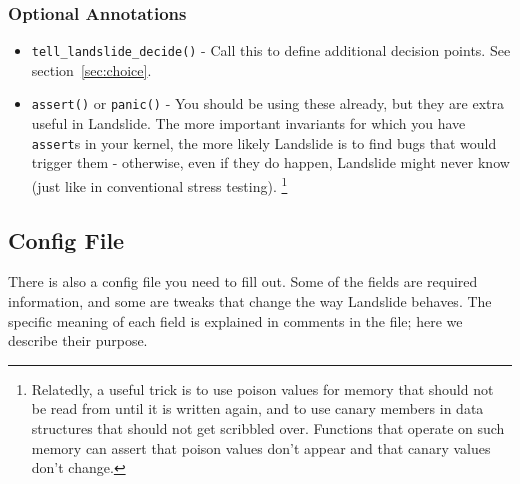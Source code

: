 \documentclass{article}
\begin{document}
\subsubsection{Optional Annotations}
\begin{itemize}
	\item \texttt{tell\_landslide\_decide()} - Call this to define additional decision points. See section~\ref{sec:choice}.
	\item \texttt{assert()} or \texttt{panic()} - You should be using these already, but they are extra useful in Landslide.
		The more important invariants for which you have \texttt{assert}s in your kernel, the more likely Landslide is to find bugs that would trigger them - otherwise, even if they do happen, Landslide might never know (just like in conventional stress testing).
		\footnote{Relatedly, a useful trick is to use poison values for memory that should not be read from until it is written again, and to use canary members in data structures that should not get scribbled over. Functions that operate on such memory can assert that poison values don't appear and that canary values don't change.}
\end{itemize}

\subsection{Config File}
\label{sec:config}

There is also a config file you need to fill out. Some of the fields are required information, and some are tweaks that change the way Landslide behaves. The specific meaning of each field is explained in comments in the file; here we describe their purpose.
\end{document}
